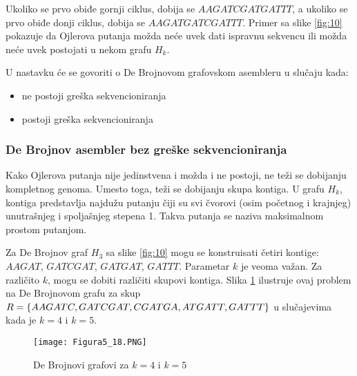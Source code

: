 \documentclass[12pt,oneside]{memoir}
\begin{document}
\noindent Ukoliko se prvo obiđe gornji ciklus, dobija se $AAGATCGATGATTT$, a ukoliko se prvo obiđe donji ciklus, dobija se $AAGATGATCGATTT$. Primer sa slike \ref{fig:10} pokazuje da Ojlerova putanja možda neće uvek dati ispravnu sekvencu ili možda neće uvek postojati u nekom grafu $H_k$.

U nastavku će se govoriti o De Brojnovom grafovskom asembleru u slučaju kada:
\begin{itemize}
\itemsep0em 
    \item{ne postoji greška sekvencioniranja}
    \item{postoji greška sekvencioniranja}
\end{itemize}

\subsubsection{De Brojnov asembler bez greške sekvencioniranja}

Kako Ojlerova putanja nije jedinstvena i možda i ne postoji, ne teži se dobijanju kompletnog genoma. Umesto toga, teži se dobijanju skupa kontiga. U grafu $H_k$, kontiga predstavlja najdužu putanju čiji su svi čvorovi (osim početnog i krajnjeg) unutrašnjeg i spoljašnjeg stepena 1. Takva putanja se naziva maksimalnom prostom putanjom. 

\begin{comment}
Slika \ref{fig:11} daje pseudokod ovog jednostavnog metoda.


\begin{figure}[!ht]
\centering
\texttt{[image: Figura5\_17.PNG]}
\caption{Jednstavan De Brojnov grafovski asmbler \cite{WingKinSung}}
\label{fig:11}
\end{figure}

\end{comment}

Za De Brojnov graf $H_3$ sa slike \ref{fig:10} mogu se konstruisati četiri kontige: $AAGAT$, $GATCGAT$, $GATGAT$, $GATTT$. Parametar $k$ je veoma važan. Za različito $k$, mogu se dobiti različiti skupovi kontiga. Slika \ref{fig:12} ilustruje ovaj problem na De Brojnovom grafu za skup $R = \{AAGATC, GATCGAT, CGATGA, ATGATT,\\ GATTT\}$ u slučajevima kada je $k = 4$ i $k = 5$.

\begin{figure}[!ht]
\centering
\texttt{[image: Figura5\_18.PNG]}
\caption{De Brojnovi grafovi za $k = 4$ i $k = 5$ \cite{WingKinSung}}
\label{fig:12}
\end{figure}
\end{document}
